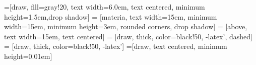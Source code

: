 \newcommand{\framedhslinecorrect}[2]%
  {#1[#2]}

\newcommand{\framedhs}{\sethscode{framedhscode}}


\newenvironment{inlinehscode}%
  {\(\def\column##1##2{}%
   \let\>\undefined\let\<\undefined\let\\\undefined
   \newcommand\>[1][]{}\newcommand\<[1][]{}\newcommand\\[1][]{}%
   \def\fromto##1##2##3{##3}%
   \def\nextline{}}{\) }%

\newcommand{\inlinehs}{\sethscode{inlinehscode}}


\newenvironment{joincode}%
  {\let\orighscode=\hscode
   \let\origendhscode=\endhscode
   \def\endhscode{\def\hscode{\endgroup\def\@currenvir{hscode}\\}\begingroup}
   \orighscode\def\hscode{\endgroup\def\@currenvir{hscode}}}%
  {\origendhscode
   \global\let\hscode=\orighscode
   \global\let\endhscode=\origendhscode}%

\makeatother
\EndFmtInput
%

=[draw, fill=gray!20, text width=6.0em, text centered,
  minimum height=1.5em,drop shadow]
 = [materia, text width=15em, minimum width=15em,
  minimum height=3em, rounded corners, drop shadow]
 = [above, text width=15em, text centered]
 = [draw, thick, color=black!50, -latex', dashed]
 = [draw, thick, color=black!50, -latex']
=[draw, text centered, minimum height=0.01em]
 
\newcommand{\blockdist}{1.3}
\newcommand{\edgedist}{1.5}

\newcommand{\blocktitle}[3]{node (p#1) [blocktitle]
  {#2 \\{\scriptsize\textit{#3}}}}


